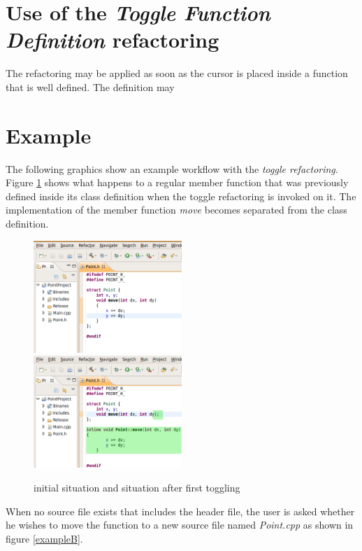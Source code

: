 \section{Use of the \textit{Toggle Function Definition} refactoring}

The refactoring may be applied as soon as the cursor is placed inside a function that is well defined. The definition may 

\section{Example}

The following graphics show an example workflow with the \textit{toggle 
refactoring}. Figure \ref{exampleA} shows what happens to a regular member 
function that was previously defined inside its class definition when the toggle 
refactoring is invoked on it. The implementation of the member function 
\textit{move} becomes separated from the class definition.

\begin{figure}[h]
\includegraphics[width=0.5\textwidth]{images/step1.png}
\includegraphics[width=0.5\textwidth]{images/step2.png}
\caption{initial situation and situation after first toggling}
\label{exampleA}
\end{figure}

When no source file exists that includes the header file, the user is asked 
whether he wishes to move the function to a new source file named 
\textit{Point.cpp} as shown in figure \ref{exampleB}.

